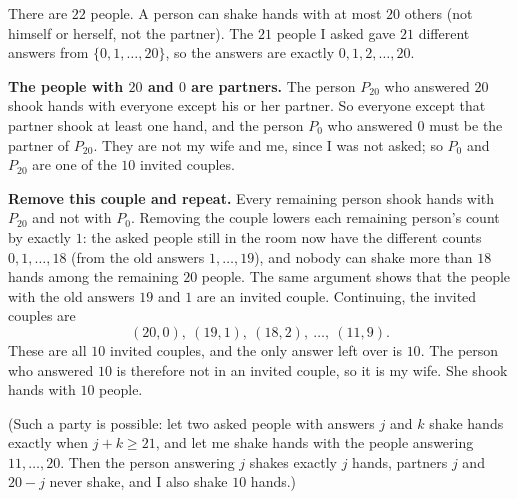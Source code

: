 There are $22$ people. A person can shake hands with at most $20$ others (not himself or herself, not the partner). The $21$ people I asked gave $21$ different answers from $\{0,1,\dots,20\}$, so the answers are exactly $0,1,2,\dots,20$.

\textbf{The people with $20$ and $0$ are partners.} The person $P_{20}$ who answered $20$ shook hands with everyone except his or her partner. So everyone except that partner shook at least one hand, and the person $P_0$ who answered $0$ must be the partner of $P_{20}$. They are not my wife and me, since I was not asked; so $P_0$ and $P_{20}$ are one of the $10$ invited couples.

\textbf{Remove this couple and repeat.} Every remaining person shook hands with $P_{20}$ and not with $P_0$. Removing the couple lowers each remaining person's count by exactly $1$: the asked people still in the room now have the different counts $0,1,\dots,18$ (from the old answers $1,\dots,19$), and nobody can shake more than $18$ hands among the remaining $20$ people. The same argument shows that the people with the old answers $19$ and $1$ are an invited couple. Continuing, the invited couples are
\[
(20,0),\ (19,1),\ (18,2),\ \dots,\ (11,9).
\]
These are all $10$ invited couples, and the only answer left over is $10$. The person who answered $10$ is therefore not in an invited couple, so it is my wife. She shook hands with $\boxed{10}$ people.

(Such a party is possible: let two asked people with answers $j$ and $k$ shake hands exactly when $j+k\ge21$, and let me shake hands with the people answering $11,\dots,20$. Then the person answering $j$ shakes exactly $j$ hands, partners $j$ and $20-j$ never shake, and I also shake $10$ hands.)
